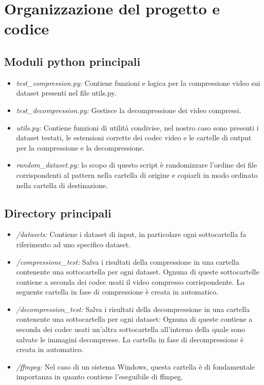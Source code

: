 \section{Organizzazione del progetto e codice}

\subsection{Moduli python principali}
\begin{itemize}
    \item \textit{test\_compression.py:} Contiene funzioni e logica per la compressione video sui dataset presenti nel file utils.py.
    \item \textit{test\_decompression.py:} Gestisce la decompressione dei video compressi.
    \item \textit{utils.py:} Contiene funzioni di utilità condivise, nel nostro caso sono presenti i dataset testati, le estensioni corrette dei codec video e le cartelle di output per la compressione e la decompressione.
    \item \textit{random\_dataset.py:} lo scopo di questo script è randomizzare l'ordine dei file corrispondenti al pattern nella cartella di origine e copiarli in modo ordinato nella cartella di destinazione.
\end{itemize}

\subsection{Directory principali}
\begin{itemize}
    \item \textit{/datasets:} Contiene i dataset di input, in particolare ogni sottocartella fa riferimento ad uno specifico dataset.
    \item \textit{/compressione\_test:} Salva i risultati della compressione in una cartella contenente una sottocartella per ogni dataset. Ognuna di queste sottocartelle contiene a seconda dei codec usati il video compresso corrispondente. La seguente cartella in fase di compressione è creata in automatico.
    \item \textit{/decompression\_test:} Salva i risultati della decompressione in una cartella contenente una sottocartella per ogni dataset: Ognuna di queste contiene a seconda dei codec usati un'altra sottocartella all'interno della quale sono salvate le immagini decompresse. La cartella in fase di decompressione è creata in automatico.
    \item \textit{/ffmpeg:} Nel caso di un sistema Windows, questa cartella è di fondamentale importanza in quanto contiene l'eseguibile di ffmpeg.

\end{itemize}

